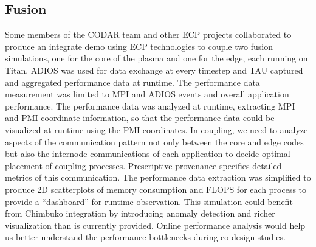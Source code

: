 \subsection{Fusion}
Some members of the CODAR team and other ECP projects collaborated to produce an integrate demo using ECP technologies to couple two fusion simulations, one for the core of the plasma and one for the edge, each running on Titan.  ADIOS was used for data exchange at every timestep and TAU captured and aggregated performance data at runtime. The performance data measurement was limited to MPI and ADIOS events and overall application performance.  The performance data was analyzed at runtime, extracting MPI and PMI coordinate information, so that the performance data could be visualized at runtime using the PMI coordinates.  In coupling, we need to analyze aspects of the communication pattern not only between the core and edge codes but also the internode communications of each application to decide optimal placement of coupling processes.  Prescriptive provenance specifies detailed metrics of this communication. 
The performance data extraction was simplified to produce 2D scatterplots of memory consumption and FLOPS for each process to provide a ``dashboard'' for runtime observation.  This simulation could benefit from Chimbuko integration by introducing anomaly detection and richer visualization than is currently provided.  Online performance analysis would help us better understand the performance bottlenecks during co-design studies.

